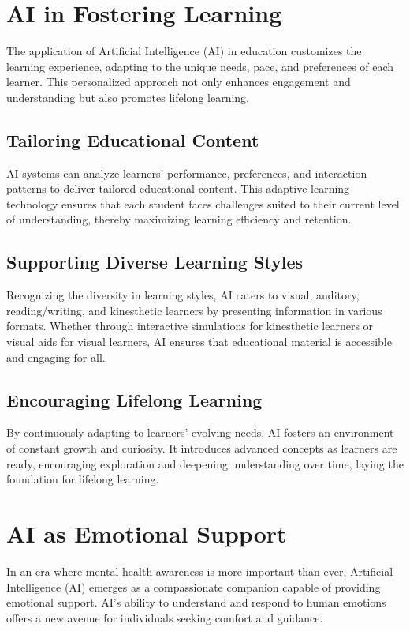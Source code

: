 \documentclass[12pt]{article}
\begin{document}
\section{AI in Fostering Learning}
The application of Artificial Intelligence (AI) in education customizes the learning experience, adapting to the unique needs, pace, and preferences of each learner. This personalized approach not only enhances engagement and understanding but also promotes lifelong learning. 

\subsection*{Tailoring Educational Content}
AI systems can analyze learners' performance, preferences, and interaction patterns to deliver tailored educational content. This adaptive learning technology ensures that each student faces challenges suited to their current level of understanding, thereby maximizing learning efficiency and retention.

\subsection*{Supporting Diverse Learning Styles}
Recognizing the diversity in learning styles, AI caters to visual, auditory, reading/writing, and kinesthetic learners by presenting information in various formats. Whether through interactive simulations for kinesthetic learners or visual aids for visual learners, AI ensures that educational material is accessible and engaging for all.

\subsection*{Encouraging Lifelong Learning}
By continuously adapting to learners' evolving needs, AI fosters an environment of constant growth and curiosity. It introduces advanced concepts as learners are ready, encouraging exploration and deepening understanding over time, laying the foundation for lifelong learning.

\section{AI as Emotional Support}
In an era where mental health awareness is more important than ever, Artificial Intelligence (AI) emerges as a compassionate companion capable of providing emotional support. AI's ability to understand and respond to human emotions offers a new avenue for individuals seeking comfort and guidance.
\end{document}
